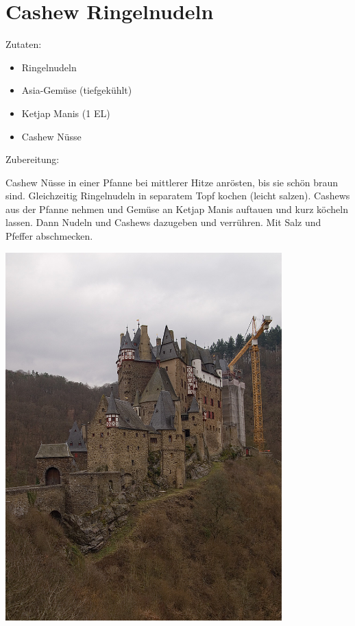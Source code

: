 \section{Cashew Ringelnudeln}
Zutaten:
\begin{itemize}
    \item Ringelnudeln
    \item Asia-Gemüse (tiefgekühlt)
    \item Ketjap Manis (1 EL)
    \item Cashew Nüsse
\end{itemize}

\noindent Zubereitung:

\noindent Cashew Nüsse in einer Pfanne bei mittlerer Hitze anrösten, bis
sie schön braun sind. Gleichzeitig Ringelnudeln in separatem Topf kochen
(leicht salzen). Cashews aus der Pfanne nehmen und Gemüse an Ketjap Manis
auftauen und kurz köcheln lassen. Dann Nudeln und Cashews dazugeben und
verrühren. Mit Salz und Pfeffer abschmecken.

\newpage
\mbox{}
\vfill
\begin{center}
    \includegraphics[width=0.8\textwidth]{Cashew-Ringelnudeln/burg.jpg}
\end{center}
\vfill
\mbox{ }
\newpage

